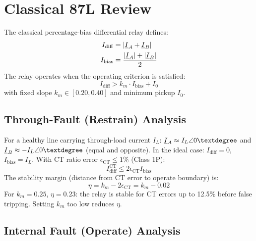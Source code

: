 \section{Classical 87L Review}
\label{sec:ch4_review}

The classical percentage-bias differential relay defines:
\begin{align}
  I_\mathrm{diff} &= |\underline{I}_A + \underline{I}_B|
  \label{eq:ch4_idiff_def} \\
  I_\mathrm{bias} &= \frac{|\underline{I}_A| + |\underline{I}_B|}{2}
  \label{eq:ch4_ibias_def}
\end{align}
The relay operates when the operating criterion is satisfied:
\begin{equation}
  \boxed{I_\mathrm{diff} > k_m \cdot I_\mathrm{bias} + I_0}
  \label{eq:ch4_87l_criterion}
\end{equation}
with fixed slope $k_m \in [0.20, 0.40]$ and minimum pickup $I_0$.

\subsection{Through-Fault (Restrain) Analysis}

For a healthy line carrying through-load current $I_L$:
$\phasor{I}_A \approx I_L\angle 0°$ and $\phasor{I}_B \approx -I_L\angle 0°$
(equal and opposite). In the ideal case:
$I_\mathrm{diff} = 0$, $I_\mathrm{bias} = I_L$.
With CT ratio error $\epsilon_\mathrm{CT} \leq 1\%$ (Class 1P):
\begin{equation}
  I_\mathrm{diff}^\mathrm{CT} \leq 2\epsilon_\mathrm{CT} I_\mathrm{bias}
  \label{eq:ch4_ct_error}
\end{equation}
The stability margin (distance from CT error to operate boundary) is:
\begin{equation}
  \eta = k_m - 2\epsilon_\mathrm{CT} = k_m - 0.02
  \label{eq:ch4_stability_margin}
\end{equation}
For $k_m = 0.25$, $\eta = 0.23$: the relay is stable for CT errors up to
12.5\% before false tripping. Setting $k_m$ too low reduces $\eta$.

\subsection{Internal Fault (Operate) Analysis}

